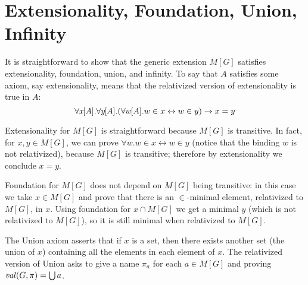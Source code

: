 \section{Extensionality, Foundation, Union, Infinity}
\label{sec:easy-axioms}
\newcommand{\forallRel}[2]{\forall #1\kern -1pt[#2]}
It is straightforward to show that the generic extension $M[G]$
satisfies extensionality, foundation, union, and infinity. %
To say that $A$ satisfies some axiom, say extensionality, means
that the relativized version of extensionality is true in $A$:
\[
\forallRel{x}{A}. \forallRel{y}{A}. (\forallRel{w}{A} . w \in x \leftrightarrow w\in y) \rightarrow x = y
\]

Extensionality for $M[G]$ is straightforward because $M[G]$ is
transitive. %
In fact, for $x,y\in M[G]$, we can prove
$\forall w. w\in x \leftrightarrow w\in y$ (notice that the binding
$w$ is not relativized), because $M[G]$ is transitive; therefore by
extensionality we conclude $x=y$.

Foundation for $M[G]$ does not depend on $M[G]$ being transitive: in
this case we take $x\in M[G]$ and prove that there is an
$\in$\kern -1pt-minimal element, relativized to $M[G]$, in $x$. Using
foundation for $x\cap M[G]$ we get a minimal $y$ (which is not
relativized to $M[G]$), so it is still minimal when relativized to
$M[G]$.

The Union axiom asserts that if $x$ is a set, then there exists
another set (the union of $x$) containing all the elements in each
element of $x$. The relativized version of Union asks to give a name
$\pi_a$ for each $a\in M[G]$ and proving $\operatorname{\mathit{val}}(G,\pi)=\bigcup a$.



